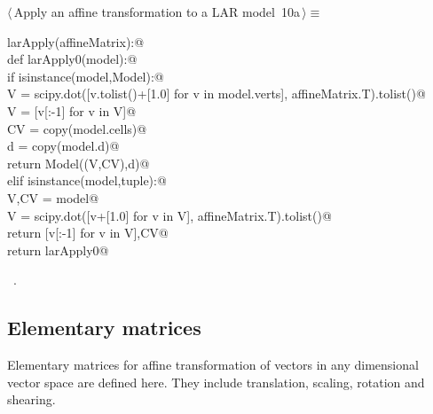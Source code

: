 \documentclass[11pt,oneside]{article}	%
\begin{document}
\begin{flushleft} \small \label{scrap18}
\protect{}$\langle\,$Apply an affine transformation to a LAR model\nobreak\ {\footnotesize 10a}$\,\rangle\equiv$
\vspace{-1ex}
\begin{list}{}{} \item
\mbox{}\verb@def larApply(affineMatrix):@\\
\mbox{}\verb@   def larApply0(model):@\\
\mbox{}\verb@      if isinstance(model,Model):@\\
\mbox{}\verb@         V = scipy.dot([v.tolist()+[1.0] for v in model.verts], affineMatrix.T).tolist()@\\
\mbox{}\verb@         V = [v[:-1] for v in V]@\\
\mbox{}\verb@         CV = copy(model.cells)@\\
\mbox{}\verb@         d = copy(model.d)@\\
\mbox{}\verb@         return Model((V,CV),d)@\\
\mbox{}\verb@      elif isinstance(model,tuple):@\\
\mbox{}\verb@         V,CV = model@\\
\mbox{}\verb@         V = scipy.dot([v+[1.0] for v in V], affineMatrix.T).tolist()@\\
\mbox{}\verb@         return [v[:-1] for v in V],CV@\\
\mbox{}\verb@   return larApply0@\\
\mbox{}\verb@@{\NWsep}
\end{list}
\vspace{-1ex}
\footnotesize\addtolength{\baselineskip}{-1ex}
\begin{list}{}{\setlength{\itemsep}{-\parsep}\setlength{\itemindent}{-\leftmargin}}
\item \NWtxtMacroRefIn\ .
\end{list}
\end{flushleft}


\subsection{Elementary matrices}
Elementary matrices for affine transformation of vectors in any dimensional vector space are defined here. They include translation, scaling, rotation and shearing. 
\end{document}
